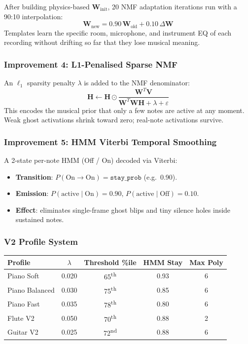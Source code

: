 \documentclass[12pt, a4paper]{article}
\begin{document}
After building physics-based $\mathbf{W}_{\text{init}}$, 20 NMF adaptation
iterations run with a 90:10 interpolation:
\begin{equation}
  \mathbf{W}_{\text{new}} = 0.90\,\mathbf{W}_{\text{old}} + 0.10\,\Delta\mathbf{W}
\end{equation}
Templates learn the specific room, microphone, and instrument EQ of each
recording without drifting so far that they lose musical meaning.

\subsubsection{Improvement 4: L1-Penalised Sparse NMF}

An $\ell_1$ sparsity penalty $\lambda$ is added to the NMF denominator:
\begin{equation}
  \mathbf{H} \leftarrow \mathbf{H} \odot
  \frac{\mathbf{W}^{T}\mathbf{V}}
       {\mathbf{W}^{T}\mathbf{W}\mathbf{H} + \lambda + \varepsilon}
\end{equation}
This encodes the musical prior that only a few notes are active at any moment.
Weak ghost activations shrink toward zero; real-note activations survive.

\subsubsection{Improvement 5: HMM Viterbi Temporal Smoothing}

A 2-state per-note HMM (Off / On) decoded via Viterbi:
\begin{itemize}[leftmargin=2em]
  \item \textbf{Transition}: $P(\text{On}\to\text{On}) = \texttt{stay\_prob}$
        (e.g.\ 0.90).
  \item \textbf{Emission}: $P(\text{active}\mid\text{On}) = 0.90$,
        $P(\text{active}\mid\text{Off}) = 0.10$.
  \item \textbf{Effect}: eliminates single-frame ghost blips and tiny
        silence holes inside sustained notes.
\end{itemize}

\subsubsection{V2 Profile System}

\begin{center}
\begin{tabular}{lcccc}
  \toprule
  Profile & $\lambda$ & Threshold \%ile & HMM Stay & Max Poly \\
  \midrule
  Piano Soft     & 0.020 & 65\textsuperscript{th} & 0.93 & 6 \\
  Piano Balanced & 0.030 & 75\textsuperscript{th} & 0.85 & 6 \\
  Piano Fast     & 0.035 & 78\textsuperscript{th} & 0.80 & 6 \\
  Flute V2       & 0.050 & 70\textsuperscript{th} & 0.88 & 2 \\
  Guitar V2      & 0.025 & 72\textsuperscript{nd} & 0.88 & 6 \\
  \bottomrule
\end{tabular}
\end{center}
\end{document}
